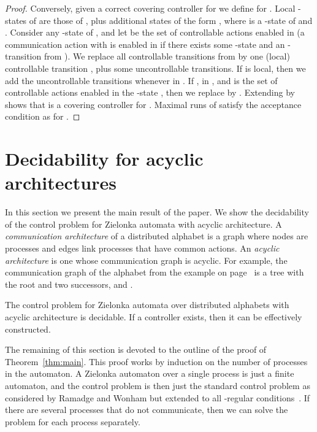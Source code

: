 \documentclass[10pt,a4paper]{article}
\newcommand{\igw}[1]{}
\begin{document}
\begin{proof}
Conversely, given a correct covering controller  for  we
define  for . Local -states of  are
those of , plus additional states of the form , where  is
a -state of  and . Consider any -state
 of , and let  be the set of controllable actions enabled
in  (a communication action  with  is enabled
in  if there exists some -state  and an -transition from
). We replace all controllable transitions from  by one
(local) controllable transition , plus some uncontrollable
transitions. If  is local, then we add the 
uncontrollable transitions  whenever   in . If ,  in , and  is the set of controllable actions
enabled in the -state ,  then we replace  by . Extending  by 
shows that  is a covering controller for . Maximal runs of  satisfy the
acceptance condition as for .
\end{proof}



\section{Decidability  for acyclic architectures}\label{sec:reduction}
In this section we present the main result of the paper.  We show the
decidability of the control problem for Zielonka automata with acyclic
architecture. A \emph{communication architecture} of a distributed
alphabet is a graph where nodes are processes and edges link processes
that have common actions. An \emph{acyclic architecture} is one whose
communication graph is acyclic\igw{changed}. For example, the communication graph
of the alphabet from the example on
page~\pageref{ex:control}\igw{reference} is a tree with the root 
and two successors,  and .

\begin{theorem}\label{thm:main}
The control problem for Zielonka automata over distributed alphabets
  with acyclic architecture is decidable. If a controller exists, then
  it can be effectively constructed.
\end{theorem}

The remaining of this section is devoted to the outline of the proof
of Theorem~\ref{thm:main}. This proof works by induction on the number
 of processes in the automaton. A Zielonka automaton over a
single process is just a finite automaton, and the control problem is
then just the standard control problem as considered by Ramadge and
Wonham but extended to all -regular conditions~\cite{AVW02}. If
there are several processes that do not communicate, then we can solve
the problem for each process separately.
\end{document}

